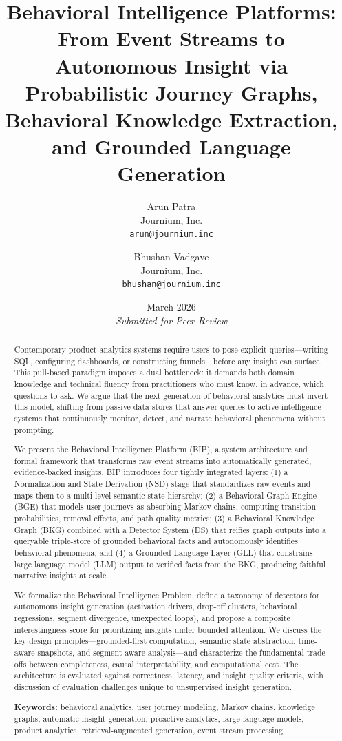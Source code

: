 \documentclass[12pt, a4paper]{article}
\title{\textbf{Behavioral Intelligence Platforms:}\\
\large From Event Streams to Autonomous Insight via\\
Probabilistic Journey Graphs, Behavioral Knowledge Extraction,\\
and Grounded Language Generation}
\author{%
  Arun Patra \\
  \normalsize Journium, Inc. \\
  \normalsize \texttt{arun@journium.inc}
  \and
  Bhushan Vadgave \\
  \normalsize Journium, Inc. \\
  \normalsize \texttt{bhushan@journium.inc}
}
\date{March 2026\\[0.5em]\textit{Submitted for Peer Review}}
\begin{document}
\maketitle

\begin{abstract}
Contemporary product analytics systems require users to pose explicit queries---writing SQL, configuring dashboards, or constructing funnels---before any insight can surface. This pull-based paradigm imposes a dual bottleneck: it demands both domain knowledge and technical fluency from practitioners who must know, in advance, which questions to ask. We argue that the next generation of behavioral analytics must invert this model, shifting from passive data stores that answer queries to active intelligence systems that continuously monitor, detect, and narrate behavioral phenomena without prompting.

We present the Behavioral Intelligence Platform (BIP), a system architecture and formal framework that transforms raw event streams into automatically generated, evidence-backed insights. BIP introduces four tightly integrated layers: (1) a Normalization and State Derivation (NSD) stage that standardizes raw events and maps them to a multi-level semantic state hierarchy; (2) a Behavioral Graph Engine (BGE) that models user journeys as absorbing Markov chains, computing transition probabilities, removal effects, and path quality metrics; (3) a Behavioral Knowledge Graph (BKG) combined with a Detector System (DS) that reifies graph outputs into a queryable triple-store of grounded behavioral facts and autonomously identifies behavioral phenomena; and (4) a Grounded Language Layer (GLL) that constrains large language model (LLM) output to verified facts from the BKG, producing faithful narrative insights at scale.

We formalize the Behavioral Intelligence Problem, define a taxonomy of detectors for autonomous insight generation (activation drivers, drop-off clusters, behavioral regressions, segment divergence, unexpected loops), and propose a composite interestingness score for prioritizing insights under bounded attention. We discuss the key design principles---grounded-first computation, semantic state abstraction, time-aware snapshots, and segment-aware analysis---and characterize the fundamental trade-offs between completeness, causal interpretability, and computational cost. The architecture is evaluated against correctness, latency, and insight quality criteria, with discussion of evaluation challenges unique to unsupervised insight generation.

\textbf{Keywords:} behavioral analytics, user journey modeling, Markov chains, knowledge graphs, automatic insight generation, proactive analytics, large language models, product analytics, retrieval-augmented generation, event stream processing
\end{abstract}
\end{document}
